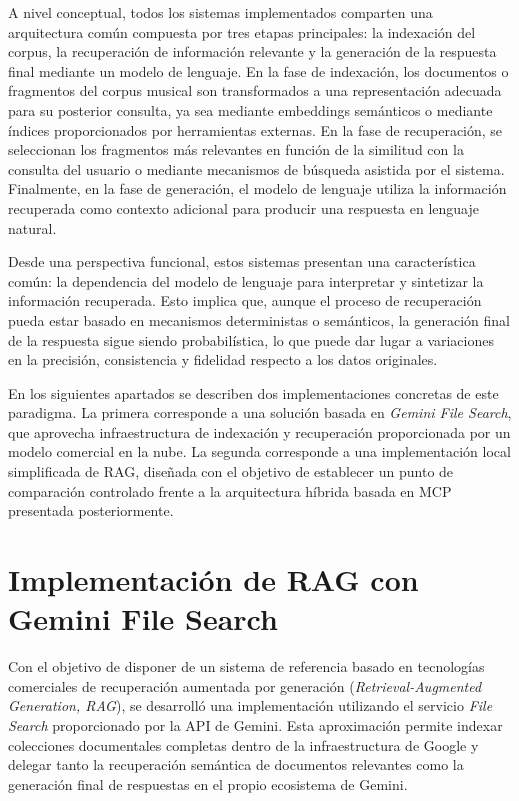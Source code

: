 A nivel conceptual, todos los sistemas implementados comparten una arquitectura común compuesta por tres etapas principales: la indexación del corpus, la recuperación de información relevante y la generación de la respuesta final mediante un modelo de lenguaje. En la fase de indexación, los documentos o fragmentos del corpus musical son transformados a una representación adecuada para su posterior consulta, ya sea mediante embeddings semánticos o mediante índices proporcionados por herramientas externas. En la fase de recuperación, se seleccionan los fragmentos más relevantes en función de la similitud con la consulta del usuario o mediante mecanismos de búsqueda asistida por el sistema. Finalmente, en la fase de generación, el modelo de lenguaje utiliza la información recuperada como contexto adicional para producir una respuesta en lenguaje natural.

Desde una perspectiva funcional, estos sistemas presentan una característica común: la dependencia del modelo de lenguaje para interpretar y sintetizar la información recuperada. Esto implica que, aunque el proceso de recuperación pueda estar basado en mecanismos deterministas o semánticos, la generación final de la respuesta sigue siendo probabilística, lo que puede dar lugar a variaciones en la precisión, consistencia y fidelidad respecto a los datos originales.

En los siguientes apartados se describen dos implementaciones concretas de este paradigma. La primera corresponde a una solución basada en \textit{Gemini File Search}, que aprovecha infraestructura de indexación y recuperación proporcionada por un modelo comercial en la nube. La segunda corresponde a una implementación local simplificada de RAG, diseñada con el objetivo de establecer un punto de comparación controlado frente a la arquitectura híbrida basada en MCP presentada posteriormente.

\section{Implementación de RAG con Gemini File Search}
Con el objetivo de disponer de un sistema de referencia basado en tecnologías comerciales de recuperación aumentada por generación (\textit{Retrieval-Augmented Generation, RAG}), se desarrolló una implementación utilizando el servicio \textit{File Search} proporcionado por la API de Gemini. Esta aproximación permite indexar colecciones documentales completas dentro de la infraestructura de Google y delegar tanto la recuperación semántica de documentos relevantes como la generación final de respuestas en el propio ecosistema de Gemini.

